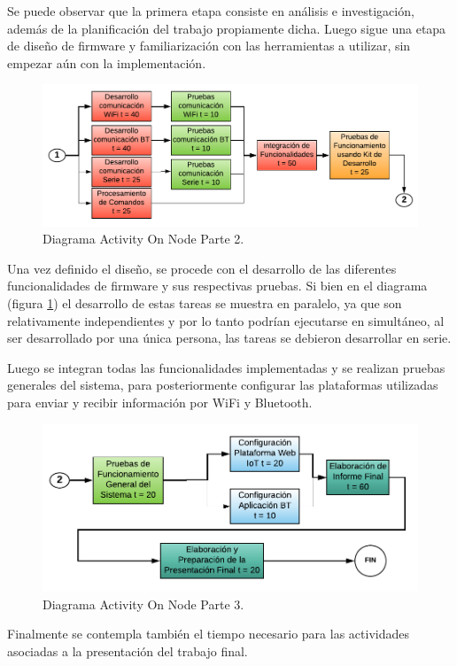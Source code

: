 Se puede observar que la primera etapa consiste en análisis e investigación, además de la planificación del trabajo propiamente dicha. Luego sigue una etapa de diseño de firmware y familiarización con las herramientas a utilizar, sin empezar aún con la implementación.

\begin{figure}[h]
\centering
\includegraphics[width=\textwidth]{./Figures/activity_on_node_2.pdf}
\caption{Diagrama Activity On Node Parte 2.}
\label{fig:activity_on_node_2}
\end{figure}

Una vez definido el diseño, se procede con el desarrollo de las diferentes funcionalidades de firmware y sus respectivas pruebas. Si bien en el diagrama (figura \ref{fig:activity_on_node_2}) el desarrollo de estas tareas se muestra en paralelo, ya que son relativamente independientes y por lo tanto podrían ejecutarse en simultáneo, al ser desarrollado por una única persona, las tareas se debieron desarrollar en serie.

Luego se integran todas las funcionalidades implementadas y se realizan pruebas generales del sistema, para posteriormente configurar las plataformas utilizadas para enviar y recibir información por WiFi y Bluetooth.

\begin{figure}[h]
\centering
\includegraphics[width=\textwidth]{./Figures/activity_on_node_3.pdf}
\caption{Diagrama Activity On Node Parte 3.}
\label{fig:activity_on_node_3}
\end{figure}

Finalmente se contempla también el tiempo necesario para las actividades asociadas a la presentación del trabajo final.





